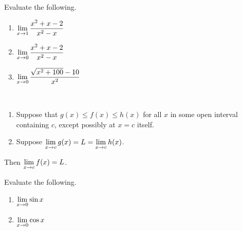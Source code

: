 \begin{example}
Evaluate the following.
\begin{enumerate}
\item $\displaystyle\lim_{x\to 1}\frac{x^2+x-2}{x^2-x}$
\vfill
\item $\displaystyle\lim_{x\to 0}\frac{x^2+x-2}{x^2-x}$
\vfill
\item $\displaystyle\lim_{x\to 0}\frac{\sqrt{x^2+100}-10}{x^2}$
\vfill
\end{enumerate}
\end{example}

\newpage

\begin{theorem}\,
\begin{enumerate}
\item Suppose that $g(x)\le f(x)\le h(x)$ for all $x$ in some open interval containing $c$, except possibly at $x=c$ itself.
\item Suppose $\displaystyle\lim_{x\to c}g(x) = L = \lim_{x\to c}h(x)$.
\end{enumerate}
Then $\displaystyle\lim_{x\to c}f(x) = L$.
\end{theorem}

\begin{example}
Evaluate the following.
\begin{enumerate}
\item $\displaystyle\lim_{x\to 0}\sin x$
\vfill
\item $\displaystyle\lim_{x\to 0}\cos x$
\vfill
\end{enumerate}
\end{example}

